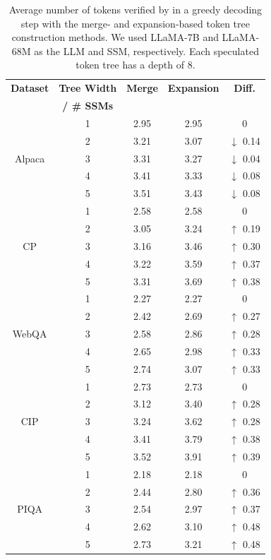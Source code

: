 \begin{table}[t]
\begin{center}
\caption{Average number of tokens verified by \SpecInfer in a greedy decoding step with the merge- and expansion-based token tree construction methods. We used LLaMA-7B and LLaMA-68M as the LLM and SSM, respectively. Each speculated token tree has a depth of 8.}
\label{specinfer:tab:eval_tree_construction_methods}
\begin{tabular}{cc|ccc}
\toprule
{\bf Dataset} & {\bf Tree Width} & {\bf Merge}  & {\bf Expansion} & {\bf Diff.} \\
 & {\bf / \# SSMs} & & & \\ \midrule
\multirow{5}{*}{Alpaca}  & 1  & 2.95     & 2.95    & 0\\
  & 2  & 3.21     & 3.07    & $\downarrow$ 0.14\\
  & 3  & 3.31     & 3.27    & $\downarrow$ 0.04\\
  & 4  & 3.41     & 3.33    & $\downarrow$ 0.08\\
  & 5  & 3.51     & 3.43    & $\downarrow$ 0.08\\
\midrule
\multirow{5}{*}{CP}  & 1  & 2.58     & 2.58    & 0\\
  & 2  & 3.05     & 3.24    & $\uparrow$ 0.19\\
  & 3  & 3.16     & 3.46    & $\uparrow$ 0.30\\
  & 4  & 3.22     & 3.59    & $\uparrow$ 0.37\\
  & 5  & 3.31     & 3.69    & $\uparrow$ 0.38\\
\midrule
\multirow{5}{*}{WebQA}  & 1  & 2.27     & 2.27    & 0\\
  & 2  & 2.42     & 2.69    & $\uparrow$ 0.27\\
  & 3  & 2.58     & 2.86    & $\uparrow$ 0.28\\
  & 4  & 2.65     & 2.98    & $\uparrow$ 0.33\\
  & 5  & 2.74     & 3.07    & $\uparrow$ 0.33\\
\midrule
\multirow{5}{*}{CIP}  & 1  & 2.73     & 2.73    & 0\\
  & 2  & 3.12     & 3.40    & $\uparrow$ 0.28\\
  & 3  & 3.24     & 3.62    & $\uparrow$ 0.28\\
  & 4  & 3.41     & 3.79    & $\uparrow$ 0.38\\
  & 5  & 3.52     & 3.91    & $\uparrow$ 0.39\\
\midrule
\multirow{5}{*}{PIQA}  & 1  & 2.18     & 2.18    & 0\\
  & 2  & 2.44     & 2.80    & $\uparrow$ 0.36\\
  & 3  & 2.54     & 2.97    & $\uparrow$ 0.37\\
  & 4  & 2.62     & 3.10    & $\uparrow$ 0.48\\
  & 5  & 2.73     & 3.21    & $\uparrow$ 0.48\\
\bottomrule
\end{tabular}
\end{center}
\end{table}

